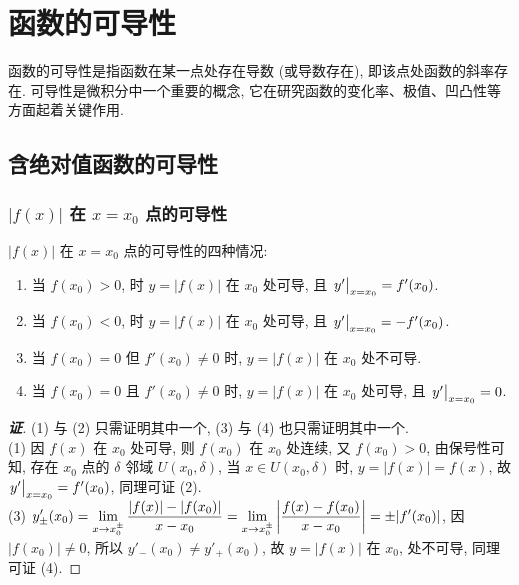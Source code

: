 \section{函数的可导性}

函数的可导性是指函数在某一点处存在导数 (或导数存在), 即该点处函数的斜率存在. 
可导性是微积分中一个重要的概念, 它在研究函数的变化率、极值、凹凸性等方面起着关键作用.

\subsection{含绝对值函数的可导性}

\subsubsection{\texorpdfstring{$|f(x)|$}. 在 \texorpdfstring{$x=x_0$}. 点的可导性}

\begin{theorem}[含绝对值函数的可导性]
    $ |f(x)| $ 在 $x=x_0$ 点的可导性的四种情况:\label{thereAreFourCasesOfDerivability}
    \begin{enumerate}[label=(\arabic{*})]
        \item 当 $f(x_0)>0$, 时 $y=|f(x)|$ 在 $x_0$ 处可导, 且 $\eval{y'}_{x=x_0}=f'(x_0)$.
        \item 当 $f(x_0)<0$, 时 $y=|f(x)|$ 在 $x_0$ 处可导, 且 $\eval{y'}_{x=x_0}=-f'(x_0)$.
        \item 当 $f(x_0)=0$ 但 $f'(x_0)\neq0$ 时, $y=|f(x)|$ 在 $x_0$ 处不可导.
        \item 当 $f(x_0)=0$ 且 $f'(x_0)\neq0$ 时, $y=|f(x)|$ 在 $x_0$ 处可导, 且 $\eval{y'}_{x=x_0}=0$.
    \end{enumerate}
\end{theorem}
\begin{proof}[{\songti \textbf{证}}]
    (1) 与 (2) 只需证明其中一个, (3) 与 (4) 也只需证明其中一个.\\
    (1) 因 $f(x)$ 在 $x_0$ 处可导, 则 $f(x_0)$ 在 $x_0$ 处连续, 又 $f(x_0)>0$, 由保号性可知, 存在 $x_0$ 点的 $\delta$ 邻域 $U(x_0,\delta)$, 
    当 $x\in U(x_0,\delta)$ 时, $y=|f(x)|=f(x)$, 故 $\eval{y'}_{x=x_0}=f'(x_0)$, 同理可证 (2).\\
    (3) $\displaystyle y'_{\pm}(x_0)=\lim_{x\to x_0^{\pm}}\dfrac{|f(x)|-|f(x_0)|}{x-x_0}=\lim_{x\to x_0^{\pm}}\qty|\dfrac{f(x)-f(x_0)}{x-x_0}|=\pm|f'(x_0)|$, 
    因 $|f(x_0)|\neq0$, 所以 $y'_-(x_0)\neq y'_+(x_0)$, 故 $y=|f(x)|$ 在 $x_0$, 处不可导, 同理可证 (4).
\end{proof}

